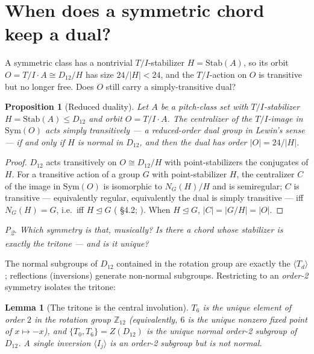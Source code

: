 \documentclass[11pt]{article}
\newtheorem{proposition}{Proposition}
\newtheorem{lemma}{Lemma}
\newcommand{\Zn}[1]{\mathbb{Z}_{#1}}
\newcommand{\Dgrp}[1]{D_{#1}}
\newcommand{\Stab}{\mathrm{Stab}}
\newcommand{\question}[1]{\smallskip\noindent\textit{#1}\smallskip}
\begin{document}
\section{When does a symmetric chord keep a dual?}\label{sec:char}

A symmetric class has a nontrivial $T/I$-stabilizer $H=\Stab(A)$, so its orbit
$O=T/I\cdot A\cong\Dgrp{12}/H$ has size $24/|H|<24$, and the $T/I$-action on $O$ is transitive but no
longer free. Does $O$ still carry a simply-transitive dual?

\begin{proposition}[Reduced duality]\label{prop:dual}
Let $A$ be a pitch-class set with $T/I$-stabilizer $H=\Stab(A)\le\Dgrp{12}$ and orbit $O=T/I\cdot A$.
The centralizer of the $T/I$-image in $\mathrm{Sym}(O)$ acts simply transitively --- a reduced-order
dual group in Lewin's sense --- \emph{if and only if $H$ is normal in $\Dgrp{12}$}, and then the dual has
order $|O|=24/|H|$.
\end{proposition}
\begin{proof}
$\Dgrp{12}$ acts transitively on $O\cong\Dgrp{12}/H$ with point-stabilizers the conjugates of $H$. For a
transitive action of a group $G$ with point-stabilizer $H$, the centralizer $C$ of the image in
$\mathrm{Sym}(O)$ is isomorphic to $N_G(H)/H$ and is semiregular; $C$ is transitive --- equivalently
regular, equivalently the dual is simply transitive --- iff $N_G(H)=G$, i.e.\ iff $H\trianglelefteq G$
(\cite{DM} \S4.2; \cite{Cam}). When $H\trianglelefteq G$, $|C|=|G/H|=|O|$.
\end{proof}

\question{P\textsubscript{2}. Which symmetry is that, musically? Is there a chord whose stabilizer is
exactly the tritone --- and is it unique?}

The normal subgroups of $\Dgrp{12}$ contained in the rotation group are exactly the
$\langle T_d\rangle$; reflections (inversions) generate non-normal subgroups. Restricting to an
\emph{order-2} symmetry isolates the tritone:

\begin{lemma}[The tritone is the central involution]\label{lem:tritone}
$T_6$ is the unique element of order $2$ in the rotation group $\Zn{12}$ (equivalently, $6$ is the unique
nonzero fixed point of $x\mapsto -x$), and $\{T_0,T_6\}=Z(\Dgrp{12})$ is the unique \emph{normal} order-2
subgroup of $\Dgrp{12}$. A single inversion $\langle I_j\rangle$ is an order-2 subgroup but is
\emph{not} normal.
\end{lemma}
\end{document}

